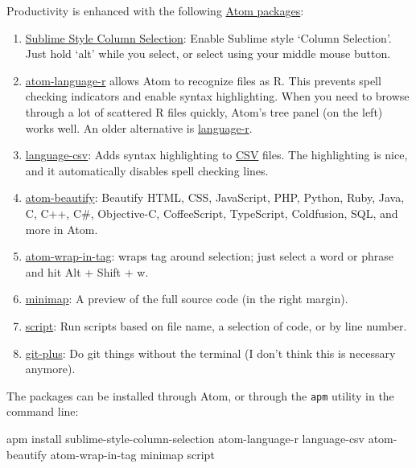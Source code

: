\documentclass[
]{book}
\newenvironment{Shaded}{\begin{snugshade}}{\end{snugshade}}
\newcommand{\FunctionTok}[1]{\textcolor[rgb]{0.00,0.00,0.00}{#1}}
\newcommand{\NormalTok}[1]{#1}
\begin{document}
\begin{itemize}
  Productivity is enhanced with the following \href{https://atom.io/packages}{Atom packages}:

  \begin{enumerate}
  \def\labelenumi{\arabic{enumi}.}
  \item
    \href{https://atom.io/packages/Sublime-Style-Column-Selection}{Sublime Style Column Selection}: Enable Sublime style `Column Selection'. Just hold `alt' while you select, or select using your middle mouse button.
  \item
    \href{https://atom.io/packages/atom-language-r}{atom-language-r} allows Atom to recognize files as R. This prevents spell checking indicators and enable syntax highlighting. When you need to browse through a lot of scattered R files quickly, Atom's tree panel (on the left) works well. An older alternative is \href{https://atom.io/packages/language-r}{language-r}.
  \item
    \href{https://atom.io/packages/language-csv}{language-csv}: Adds syntax highlighting to \href{https://en.wikipedia.org/wiki/Comma-separated_values}{CSV} files. The highlighting is nice, and it automatically disables spell checking lines.
  \item
    \href{https://atom.io/packages/atom-beautify}{atom-beautify}: Beautify HTML, CSS, JavaScript, PHP, Python, Ruby, Java, C, C++, C\#, Objective-C, CoffeeScript, TypeScript, Coldfusion, SQL, and more in Atom.
  \item
    \href{https://atom.io/packages/atom-wrap-in-tag}{atom-wrap-in-tag}: wraps tag around selection; just select a word or phrase and hit Alt + Shift + w.
  \item
    \href{https://atom.io/packages/minimap}{minimap}: A preview of the full source code (in the right margin).
  \item
    \href{https://atom.io/packages/script}{script}: Run scripts based on file name, a selection of code, or by line number.
  \item
    \href{https://atom.io/packages/git-plus}{git-plus}: Do git things without the terminal (I don't think this is necessary anymore).
  \end{enumerate}

  The packages can be installed through Atom, or through the \texttt{apm} utility in the command line:

\begin{Shaded}
\begin{Highlighting}[]
\FunctionTok{apm}\NormalTok{ install sublime{-}style{-}column{-}selection atom{-}language{-}r language{-}csv atom{-}beautify atom{-}wrap{-}in{-}tag minimap script}
\end{Highlighting}
\end{Shaded}


\end{itemize}
\end{document}
